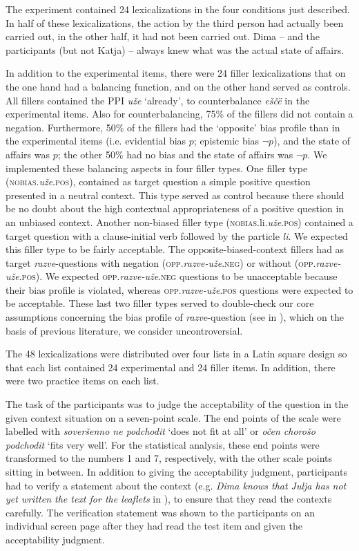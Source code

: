 \documentclass[output=paper,colorlinks,citecolor=brown]{langscibook}
\begin{document}
The experiment contained 24 lexicalizations in the four conditions just described. In half of these lexicalizations, the action by the third person had actually been carried out, in the other half, it had not been carried out. Dima – and the participants (but not Katja) – always knew what was the actual state of affairs.

In addition to the experimental items, there were 24 filler lexicalizations that on the one hand
had a balancing function, and on the other hand served as controls. All fillers contained the PPI \textit{uže} `already', to counterbalance \textit{eščë} in the experimental items. Also for counterbalancing, 75\% of the fillers did not contain a negation. Furthermore, 50\% of the fillers had the `opposite' bias profile than in the experimental items (i.e. evidential bias $p$; epistemic bias $\neg p$), and the state of affairs was $p$; the other 50\% had no bias and the state of affairs was $\neg p$. We implemented these balancing aspects in four filler types. One filler type (\textsc{nobias}.\textit{uže}.\textsc{pos}), contained as target
question a simple positive question presented in a neutral context. This type served as control because there should be no doubt about the high contextual appropriateness of a positive question in an unbiased context. Another non-biased filler type (\textsc{nobias}.li.\textit{uže}.\textsc{pos}) contained a target question with a clause-initial verb followed by the particle \textit{li}. We expected this filler type to be fairly acceptable. The opposite-biased-context fillers had as target \textit{razve}-questions with negation (\textsc{opp}.\textit{razve-uže}.\textsc{neg}) or without (\textsc{opp}.\textit{razve-uže}.\textsc{pos}). We expected \textsc{opp}.\textit{razve-uže}.\textsc{neg} questions to be unacceptable because their bias profile is violated, whereas \textsc{opp}.\textit{razve-uže}.\textsc{pos} questions were expected to be acceptable. These last two filler types served to double-check our core assumptions concerning the bias profile of \textit{razve}-question (see  in ), which on the basis of previous literature, we consider uncontroversial.

The 48 lexicalizations were distributed over four lists in a Latin square design so that each list contained 24 experimental and 24 filler items. In addition, there were two practice items on each list.

The task of the participants was to judge the acceptability of the question in the given context situation on a seven-point scale. The end points of the scale were labelled with \textit{soveršenno ne podchodit} `does not fit at all' or \textit{očen chorošo podchodit} `fits very well'. For the statistical analysis, these end points were transformed to the numbers 1 and 7, respectively, with the other scale points sitting in between. In addition to giving the acceptability judgment, participants had to verify a statement about the context (e.g. \textit{Dima knows that Julja has not yet written the text for the leaflets} in ), to ensure that they read the contexts carefully. The verification statement was shown to the participants on an individual screen page after they had read the test item and given the acceptability judgment.
\end{document}
